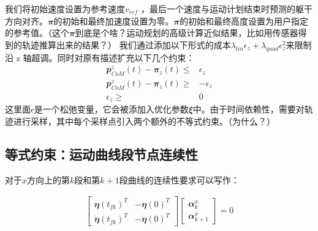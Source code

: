 我们将初始速度设置为参考速度$v_{ref}$ ，最后一个速度与运动计划结束时预测的躯干方向对齐。${\mathbfit  \pi}$的初始和最终加速度设置为零。${\mathbfit  \pi}$的初始和最终高度设置为用户指定的参考值。（这个${\mathbfit  \pi}$到底是个啥？运动规划的高级计算近似结果，比如用传感器得到的轨迹推算出来的结果？）
我们通过添加以下形式的成本$\lambda_{lin}\epsilon_z+\lambda_{quad}\epsilon_z^2$来限制沿 z 轴超调。同时对原有描述扩充以下几个约束：
\begin{align}
    {\mathbfit p}_{CoM}^z(t)-{\mathbfit \pi}_z(t)\leq &\epsilon_z \\
    {\mathbfit p}_{CoM}^z(t)-{\mathbfit \pi}_z(t)\geq & -\epsilon_z \\
    \epsilon_z \geq & 0
\end{align}
这里面$\epsilon$是一个松弛变量，它会被添加入优化参数${\mathbfit \xi}$中。由于时间依赖性，需要对轨迹进行采样，其中每个采样点引入两个额外的不等式约束。（为什么？）

\subsection{等式约束：运动曲线段节点连续性}
对于$x$方向上的第$k$段和第$k+1$段曲线的连续性要求可以写作：

\begin{align}
    \begin{bmatrix}
    {\mathbfit \eta}(t_{fk})^T & -{\mathbfit \eta}(0)^T \\ \dot {\mathbfit \eta}(t_{fk})^T & - \dot {\mathbfit \eta}(0)^T
    \end{bmatrix}
    \begin{bmatrix}
    {\mathbfit \alpha}_k^x \\ {\mathbfit \alpha}_{k+1}^x
    \end{bmatrix} = 0
\end{align}


